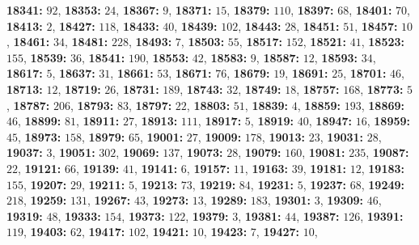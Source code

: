 \textsf{\bfseries 18341:} $92$, \textsf{\bfseries 18353:} $24$, \textsf{\bfseries 18367:} $9$, \textsf{\bfseries 18371:} $15$, \textsf{\bfseries 18379:} $110$, \textsf{\bfseries 18397:} $68$, \textsf{\bfseries 18401:} $70$, \textsf{\bfseries 18413:} $2$, \textsf{\bfseries 18427:} $118$, \textsf{\bfseries 18433:} $40$, \textsf{\bfseries 18439:} $102$, \textsf{\bfseries 18443:} $28$, \textsf{\bfseries 18451:} $51$, \textsf{\bfseries 18457:} $10$, \textsf{\bfseries 18461:} $34$, \textsf{\bfseries 18481:} $228$, \textsf{\bfseries 18493:} $7$, \textsf{\bfseries 18503:} $55$, \textsf{\bfseries 18517:} $152$, \textsf{\bfseries 18521:} $41$, \textsf{\bfseries 18523:} $155$, \textsf{\bfseries 18539:} $36$, \textsf{\bfseries 18541:} $190$, \textsf{\bfseries 18553:} $42$, \textsf{\bfseries 18583:} $9$, \textsf{\bfseries 18587:} $12$, \textsf{\bfseries 18593:} $34$, \textsf{\bfseries 18617:} $5$, \textsf{\bfseries 18637:} $31$, \textsf{\bfseries 18661:} $53$, \textsf{\bfseries 18671:} $76$, \textsf{\bfseries 18679:} $19$, \textsf{\bfseries 18691:} $25$, \textsf{\bfseries 18701:} $46$, \textsf{\bfseries 18713:} $12$, \textsf{\bfseries 18719:} $26$, \textsf{\bfseries 18731:} $189$, \textsf{\bfseries 18743:} $32$, \textsf{\bfseries 18749:} $18$, \textsf{\bfseries 18757:} $168$, \textsf{\bfseries 18773:} $5$, \textsf{\bfseries 18787:} $206$, \textsf{\bfseries 18793:} $83$, \textsf{\bfseries 18797:} $22$, \textsf{\bfseries 18803:} $51$, \textsf{\bfseries 18839:} $4$, \textsf{\bfseries 18859:} $193$, \textsf{\bfseries 18869:} $46$, \textsf{\bfseries 18899:} $81$, \textsf{\bfseries 18911:} $27$, \textsf{\bfseries 18913:} $111$, \textsf{\bfseries 18917:} $5$, \textsf{\bfseries 18919:} $40$, \textsf{\bfseries 18947:} $16$, \textsf{\bfseries 18959:} $45$, \textsf{\bfseries 18973:} $158$, \textsf{\bfseries 18979:} $65$, \textsf{\bfseries 19001:} $27$, \textsf{\bfseries 19009:} $178$, \textsf{\bfseries 19013:} $23$, \textsf{\bfseries 19031:} $28$, \textsf{\bfseries 19037:} $3$, \textsf{\bfseries 19051:} $302$, \textsf{\bfseries 19069:} $137$, \textsf{\bfseries 19073:} $28$, \textsf{\bfseries 19079:} $160$, \textsf{\bfseries 19081:} $235$, \textsf{\bfseries 19087:} $22$, \textsf{\bfseries 19121:} $66$, \textsf{\bfseries 19139:} $41$, \textsf{\bfseries 19141:} $6$, \textsf{\bfseries 19157:} $11$, \textsf{\bfseries 19163:} $39$, \textsf{\bfseries 19181:} $12$, \textsf{\bfseries 19183:} $155$, \textsf{\bfseries 19207:} $29$, \textsf{\bfseries 19211:} $5$, \textsf{\bfseries 19213:} $73$, \textsf{\bfseries 19219:} $84$, \textsf{\bfseries 19231:} $5$, \textsf{\bfseries 19237:} $68$, \textsf{\bfseries 19249:} $218$, \textsf{\bfseries 19259:} $131$, \textsf{\bfseries 19267:} $43$, \textsf{\bfseries 19273:} $13$, \textsf{\bfseries 19289:} $183$, \textsf{\bfseries 19301:} $3$, \textsf{\bfseries 19309:} $46$, \textsf{\bfseries 19319:} $48$, \textsf{\bfseries 19333:} $154$, \textsf{\bfseries 19373:} $122$, \textsf{\bfseries 19379:} $3$, \textsf{\bfseries 19381:} $44$, \textsf{\bfseries 19387:} $126$, \textsf{\bfseries 19391:} $119$, \textsf{\bfseries 19403:} $62$, \textsf{\bfseries 19417:} $102$, \textsf{\bfseries 19421:} $10$, \textsf{\bfseries 19423:} $7$, \textsf{\bfseries 19427:} $10$, 
